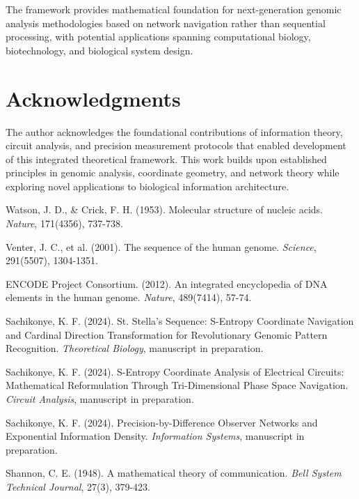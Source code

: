\documentclass[12pt,a4paper]{article}
\begin{document}
\begin{table}[H]
The framework provides mathematical foundation for next-generation genomic analysis methodologies based on network navigation rather than sequential processing, with potential applications spanning computational biology, biotechnology, and biological system design.

\section*{Acknowledgments}

The author acknowledges the foundational contributions of information theory, circuit analysis, and precision measurement protocols that enabled development of this integrated theoretical framework. This work builds upon established principles in genomic analysis, coordinate geometry, and network theory while exploring novel applications to biological information architecture.


\begin{thebibliography}{99}

Watson, J. D., \& Crick, F. H. (1953). Molecular structure of nucleic acids. \textit{Nature}, 171(4356), 737-738.

Venter, J. C., et al. (2001). The sequence of the human genome. \textit{Science}, 291(5507), 1304-1351.

ENCODE Project Consortium. (2012). An integrated encyclopedia of DNA elements in the human genome. \textit{Nature}, 489(7414), 57-74.

Sachikonye, K. F. (2024). St. Stella's Sequence: S-Entropy Coordinate Navigation and Cardinal Direction Transformation for Revolutionary Genomic Pattern Recognition. \textit{Theoretical Biology}, manuscript in preparation.

Sachikonye, K. F. (2024). S-Entropy Coordinate Analysis of Electrical Circuits: Mathematical Reformulation Through Tri-Dimensional Phase Space Navigation. \textit{Circuit Analysis}, manuscript in preparation.

Sachikonye, K. F. (2024). Precision-by-Difference Observer Networks and Exponential Information Density. \textit{Information Systems}, manuscript in preparation.

Shannon, C. E. (1948). A mathematical theory of communication. \textit{Bell System Technical Journal}, 27(3), 379-423.


\end{thebibliography}
\end{table}
\end{document}
